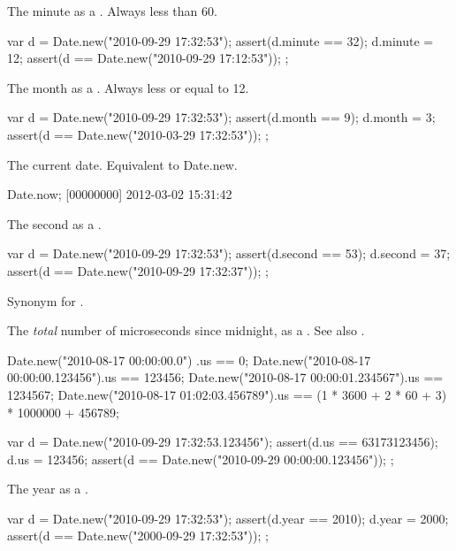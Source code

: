 \begin{urbiscriptapi}
\item[minute]
  The minute as a .  Always less than 60.
\begin{urbiscript}
{
  var d = Date.new("2010-09-29 17:32:53");
  assert(d.minute == 32);
  d.minute = 12;
  assert(d == Date.new("2010-09-29 17:12:53"));
};
\end{urbiscript}

\item[month]
  The month as a .  Always less or equal to 12.
\begin{urbiscript}
{
  var d = Date.new("2010-09-29 17:32:53");
  assert(d.month == 9);
  d.month = 3;
  assert(d == Date.new("2010-03-29 17:32:53"));
};
\end{urbiscript}

\item[now] The current date. Equivalent to Date.new.
\begin{urbiunchecked}
Date.now;
[00000000] 2012-03-02 15:31:42
\end{urbiunchecked}

\item[second]
  The second as a .
\begin{urbiscript}
{
  var d = Date.new("2010-09-29 17:32:53");
  assert(d.second == 53);
  d.second = 37;
  assert(d == Date.new("2010-09-29 17:32:37"));
};
\end{urbiscript}

\item[timestamp] Synonym for .

\item[us]%
  The \emph{total} number of microseconds since midnight, as a
  .  See also .
\begin{urbiassert}
Date.new("2010-08-17 00:00:00.0")     .us == 0;
Date.new("2010-08-17 00:00:00.123456").us == 123456;
Date.new("2010-08-17 00:00:01.234567").us == 1234567;
Date.new("2010-08-17 01:02:03.456789").us
  == (1 * 3600 + 2 * 60 + 3) * 1000000 + 456789;
\end{urbiassert}

\begin{urbiscript}
{
  var d = Date.new("2010-09-29 17:32:53.123456");
  assert(d.us == 63173123456);
  d.us = 123456;
  assert(d == Date.new("2010-09-29 00:00:00.123456"));
};
\end{urbiscript}

\item[year]
  The year as a .
\begin{urbiscript}
{
  var d = Date.new("2010-09-29 17:32:53");
  assert(d.year == 2010);
  d.year = 2000;
  assert(d == Date.new("2000-09-29 17:32:53"));
};
\end{urbiscript}
\end{urbiscriptapi}



